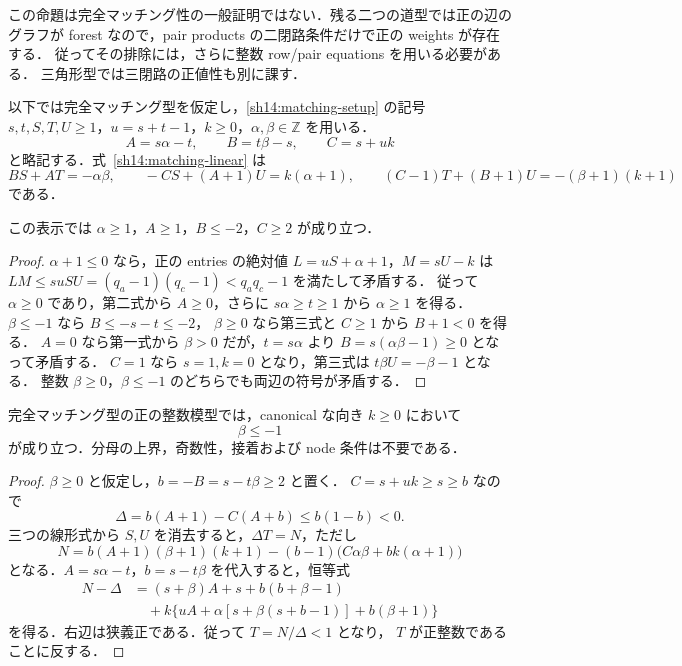 この命題は完全マッチング性の一般証明ではない．残る二つの道型では正の辺のグラフが
forest なので，pair products の二閉路条件だけで正の weights が存在する．
従ってその排除には，さらに整数 row/pair equations を用いる必要がある．
三角形型では三閉路の正値性も別に課す．

以下では完全マッチング型を仮定し，\ref{sh14:matching-setup} の記号
$s,t,S,T,U\geq1$，$u=s+t-1$，$k\geq0$，$\alpha,\beta\in\mathbb Z$ を用いる．
\[
 A=s\alpha-t,\qquad B=t\beta-s,\qquad C=s+uk
\]
と略記する．式~\eqref{sh14:matching-linear} は
\begin{equation}\label{sm14:linear}
 BS+AT=-\alpha\beta,\qquad
 -CS+(A+1)U=k(\alpha+1),\qquad
 (C-1)T+(B+1)U=-(\beta+1)(k+1)
\end{equation}
である．

\begin{lemma}
\label{sm14:basic-bounds}
この表示では $\alpha\geq1$，$A\geq1$，$B\leq-2$，$C\geq2$ が成り立つ．
\end{lemma}

\begin{proof}
$\alpha+1\leq0$ なら，正の entries の絶対値 $L=uS+\alpha+1$，$M=sU-k$ は
$LM\leq suSU=(q_a-1)(q_c-1)<q_aq_c-1$ を満たして矛盾する．
従って $\alpha\geq0$ であり，第二式から $A\geq0$，さらに $s\alpha\geq t\geq1$ から
$\alpha\geq1$ を得る．$\beta\leq-1$ なら $B\leq-s-t\leq-2$，
$\beta\geq0$ なら第三式と $C\geq1$ から $B+1<0$ を得る．
$A=0$ なら第一式から $\beta>0$ だが，$t=s\alpha$ より
$B=s(\alpha\beta-1)\geq0$ となって矛盾する．
$C=1$ なら $s=1,k=0$ となり，第三式は $t\beta U=-\beta-1$ となる．
整数 $\beta\geq0$，$\beta\leq-1$ のどちらでも両辺の符号が矛盾する．
\end{proof}

\begin{theorem}
\label{sm14:beta-negative}
完全マッチング型の正の整数模型では，canonical な向き $k\geq0$ において
\[
 \beta\leq-1
\]
が成り立つ．分母の上界，奇数性，接着および node 条件は不要である．
\end{theorem}

\begin{proof}
$\beta\geq0$ と仮定し，$b=-B=s-t\beta\geq2$ と置く．
$C=s+uk\geq s\geq b$ なので
\[
 \Delta=b(A+1)-C(A+b)\leq b(1-b)<0.
\]
三つの線形式から $S,U$ を消去すると，$\Delta T=N$，ただし
\[
 N=b(A+1)(\beta+1)(k+1)
   -(b-1)\bigl(C\alpha\beta+bk(\alpha+1)\bigr)
\]
となる．$A=s\alpha-t$，$b=s-t\beta$ を代入すると，恒等式
\begin{align*}
 N-\Delta
  &=(s+\beta)A+s+b(b+\beta-1)\\
  &\quad+k\bigl\{uA+\alpha[s+\beta(s+b-1)]+b(\beta+1)\bigr\}
\end{align*}
を得る．右辺は狭義正である．従って $T=N/\Delta<1$ となり，
$T$ が正整数であることに反する．
\end{proof}

